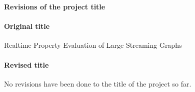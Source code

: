 \begin{center}
    {\large \textbf{Revisions of the project title\\}}
    \vspace{2cm}
\end{center}

\paragraph{Original title}
Realtime Property Evaluation of Large Streaming Graphs

\paragraph{Revised title}
No revisions have been done to the title of the project so far. 